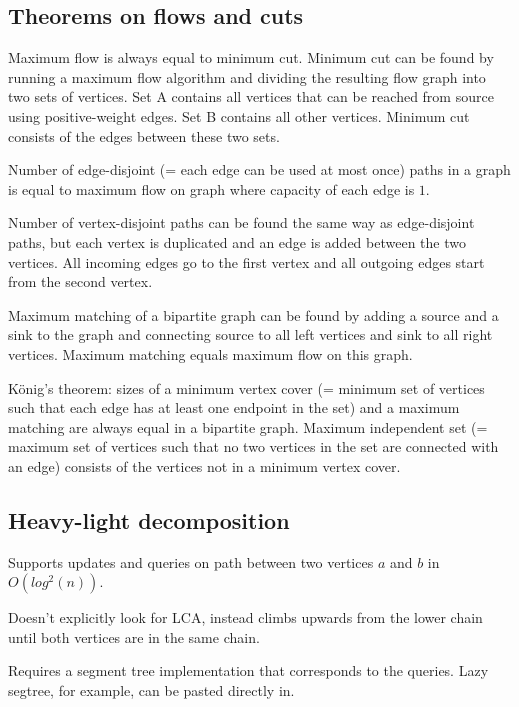 \documentclass{article}
\begin{document}


\subsection {Theorems on flows and cuts}

Maximum flow is always equal to minimum cut. Minimum cut can be found by running a maximum flow algorithm and dividing the resulting flow graph into two sets of vertices. Set A contains all vertices that can be reached from source using positive-weight edges. Set B contains all other vertices. Minimum cut consists of the edges between these two sets.

Number of edge-disjoint (= each edge can be used at most once) paths in a graph is equal to maximum flow on graph where capacity of each edge is $1$.

Number of vertex-disjoint paths can be found the same way as edge-disjoint paths, but each vertex is duplicated and an edge is added between the two vertices. All incoming edges go to the first vertex and all outgoing edges start from the second vertex.

Maximum matching of a bipartite graph can be found by adding a source and a sink to the graph and connecting source to all left vertices and sink to all right vertices. Maximum matching equals maximum flow on this graph.

König's theorem: sizes of a minimum vertex cover (= minimum set of vertices such that each edge has at least one endpoint in the set) and a maximum matching are always equal in a bipartite graph. Maximum independent set (= maximum set of vertices such that no two vertices in the set are connected with an edge) consists of the vertices not in a minimum vertex cover.

\subsection {Heavy-light decomposition}

Supports updates and queries on path between two vertices $a$ and $b$ in $O(log^2(n))$.

Doesn't explicitly look for LCA, instead climbs upwards from the lower chain until both vertices are in the same chain.

Requires a segment tree implementation that corresponds to the queries. Lazy segtree, for example, can be pasted directly in.


\end{document}
